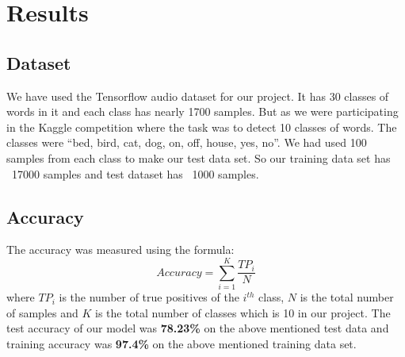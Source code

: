 \section{Results}
\subsection{Dataset}
We have used the Tensorflow audio dataset \cite{b4} for our project. It has 30 classes of words in it and each class has nearly 1700 samples. But as we were participating in the Kaggle competition where the task was to detect 10 classes of words. The classes were ``bed, bird, cat, dog, on, off, house, yes, no''. We had used 100 samples from each class to make our test data set. So our training data set has ~17000 samples and test dataset has ~1000 samples. 
\subsection{Accuracy}
The accuracy was measured using the formula: 
$$Accuracy=\sum_{i=1}^{K} \frac{TP_i}{N}$$
where $TP_i$ is the number of true positives of the $i^{th}$ class, $N$ is the total number of samples and $K$ is the total number of classes which is 10 in our project.
The test accuracy of our model was \textbf{78.23\%} on the above mentioned test data and training accuracy was \textbf{97.4\%} on the above mentioned training data set. 